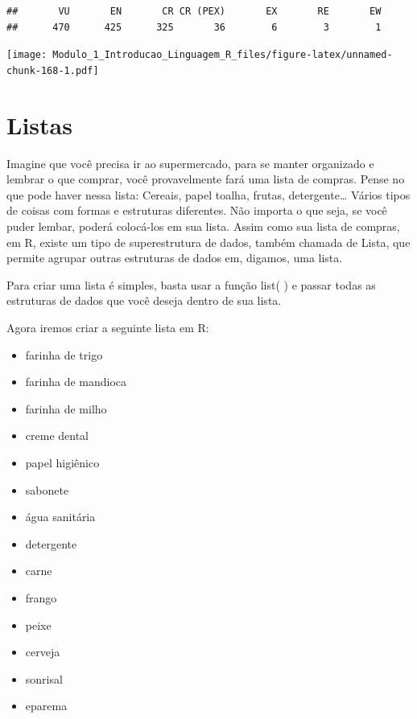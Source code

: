 \documentclass[
]{article}
\newenvironment{Shaded}{\begin{snugshade}}{\end{snugshade}}
\newcommand{\CommentTok}[1]{\textcolor[rgb]{0.56,0.35,0.01}{\textit{#1}}}
\newcommand{\FunctionTok}[1]{\textcolor[rgb]{0.00,0.00,0.00}{#1}}
\newcommand{\NormalTok}[1]{#1}
\newcommand{\SpecialCharTok}[1]{\textcolor[rgb]{0.00,0.00,0.00}{#1}}
\providecommand{\tightlist}{%
  \setlength{\itemsep}{0pt}\setlength{\parskip}{0pt}}
\begin{document}
\begin{Shaded}
\end{Shaded}

\begin{verbatim}
##       VU       EN       CR CR (PEX)       EX       RE       EW 
##      470      425      325       36        6        3        1
\end{verbatim}

\begin{Shaded}
\end{Shaded}

\texttt{[image: Modulo\_1\_Introducao\_Linguagem\_R\_files/figure-latex/unnamed-chunk-168-1.pdf]}

\hypertarget{listas}{%
\section{Listas}\label{listas}}

Imagine que você precisa ir ao supermercado, para se manter organizado e
lembrar o que comprar, você provavelmente fará uma lista de compras.
Pense no que pode haver nessa lista: Cereais, papel toalha, frutas,
detergente\ldots{} Vários tipos de coisas com formas e estruturas
diferentes. Não importa o que seja, se você puder lembar, poderá
colocá-los em sua lista. Assim como sua lista de compras, em R, existe
um tipo de superestrutura de dados, também chamada de Lista, que permite
agrupar outras estruturas de dados em, digamos, uma lista.

Para criar uma lista é simples, basta usar a função list( ) e passar
todas as estruturas de dados que você deseja dentro de sua lista.

Agora iremos criar a seguinte lista em R:

\begin{itemize}
\tightlist
\item
  farinha de trigo
\item
  farinha de mandioca
\item
  farinha de milho
\item
  creme dental
\item
  papel higiênico
\item
  sabonete
\item
  água sanitária
\item
  detergente
\item
  carne
\item
  frango
\item
  peixe
\item
  cerveja
\item
  sonrisal
\item
  eparema
\end{itemize}
\end{document}
